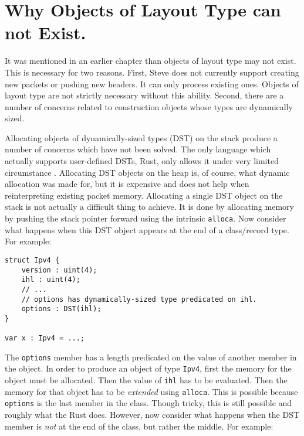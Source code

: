\section{Why Objects of Layout Type can not Exist.} \label{guide:no_dst}

It was mentioned in an earlier chapter than objects of layout type may not exist.
This is necessary for two reasons.
First, Steve does not currently support creating new packets or pushing new headers.
It can only process existing ones.
Objects of layout type are not strictly necessary without this ability.
Second, there are a number of concerns related to construction objects whose
types are dynamically sized.

Allocating objects of dynamically-sized types (DST) on the stack produce a number of concerns which have not been solved.
The only language which actually supports user-defined DSTs, Rust, only allows it under
very limited circumstance \cite{rust_dst_std}.
Allocating DST objects on the heap is, of course, what dynamic allocation was made for, but
it is expensive and does not help when reinterpreting existing packet memory.
Allocating a single DST object on the stack is not actually a difficult thing to achieve.
It is done by allocating memory by pushing the stack pointer forward using the intrinsic
\texttt{alloca}.
Now consider what happens when this DST object appears at the end of a class/record
type. For example:

\begin{codepage}
\begin{lstlisting}
struct Ipv4 {
	version : uint(4);
	ihl : uint(4);
	// ...
	// options has dynamically-sized type predicated on ihl.
	options : DST(ihl);
}

var x : Ipv4 = ...;
\end{lstlisting}
\end{codepage}

The \texttt{options} member has a length predicated on the value
of another member in the object. In order to produce an object of type \texttt{Ipv4},
first the memory for the object must be allocated. Then the value of \texttt{ihl}
has to be evaluated. Then the memory for that object has to be \emph{extended}
using \texttt{alloca}. This is possible because \texttt{options} is the last member in the class. Though tricky, this is still possible and roughly what the Rust does.
However, now consider what happens when the DST member is \emph{not} at the end
of the class, but rather the middle. For example:

